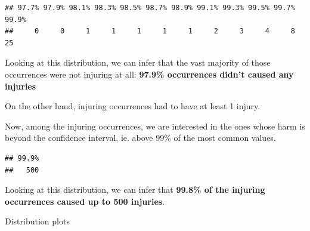 \documentclass[]{article}
\newenvironment{Shaded}{\begin{snugshade}}{\end{snugshade}}
\newcommand{\KeywordTok}[1]{\textcolor[rgb]{0.13,0.29,0.53}{\textbf{{#1}}}}
\newcommand{\DataTypeTok}[1]{\textcolor[rgb]{0.13,0.29,0.53}{{#1}}}
\newcommand{\DecValTok}[1]{\textcolor[rgb]{0.00,0.00,0.81}{{#1}}}
\newcommand{\FloatTok}[1]{\textcolor[rgb]{0.00,0.00,0.81}{{#1}}}
\newcommand{\StringTok}[1]{\textcolor[rgb]{0.31,0.60,0.02}{{#1}}}
\newcommand{\CommentTok}[1]{\textcolor[rgb]{0.56,0.35,0.01}{\textit{{#1}}}}
\newcommand{\NormalTok}[1]{{#1}}
\begin{document}
\begin{verbatim}
## 97.7% 97.9% 98.1% 98.3% 98.5% 98.7% 98.9% 99.1% 99.3% 99.5% 99.7% 99.9% 
##     0     0     1     1     1     1     1     2     3     4     8    25
\end{verbatim}

Looking at this distribution, we can infer that the vast majority of
those occurrences were not injuring at all: \textbf{97.9\% occurrences
didn't caused any injuries}

On the other hand, injuring occurrences had to have at least 1 injury.

Now, among the injuring occurrences, we are interested in the ones whose
harm is beyond the confidence interval, ie. above 99\% of the most
common values.

\begin{Shaded}
\end{Shaded}

\begin{verbatim}
## 99.9% 
##   500
\end{verbatim}

Looking at this distribution, we can infer that \textbf{99.8\% of the
injuring occurrences caused up to 500 injuries}.

Distribution plots
\end{document}
